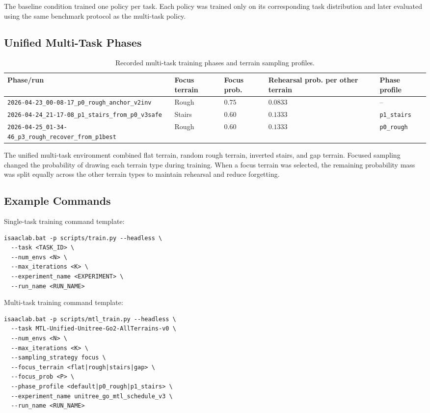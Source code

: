The baseline condition trained one policy per task. Each policy was trained only on its corresponding task distribution and later evaluated using the same benchmark protocol as the multi-task policy.

\subsection{Unified Multi-Task Phases}
\label{app:mtl-phases}

\begin{table}[htbp]
\centering
\caption{Recorded multi-task training phases and terrain sampling profiles.}
\label{tab:mtl-training-phases}
\begin{tabular}{lllll}
\toprule
Phase/run & Focus terrain & Focus prob. & Rehearsal prob. per other terrain & Phase profile \\
\midrule
\texttt{2026-04-23\_00-08-17\_p0\_rough\_anchor\_v2inv} & Rough & $0.75$ & $0.0833$ & -- \\
\texttt{2026-04-24\_21-17-08\_p1\_stairs\_from\_p0\_v3safe} & Stairs & $0.60$ & $0.1333$ & \texttt{p1\_stairs} \\
\texttt{2026-04-25\_01-34-46\_p3\_rough\_recover\_from\_p1best} & Rough & $0.60$ & $0.1333$ & \texttt{p0\_rough} \\
\bottomrule
\end{tabular}
\end{table}

The unified multi-task environment combined flat terrain, random rough terrain, inverted stairs, and gap terrain. Focused sampling changed the probability of drawing each terrain type during training. When a focus terrain was selected, the remaining probability mass was split equally across the other terrain types to maintain rehearsal and reduce forgetting.

\subsection{Example Commands}
\label{app:training-commands}

Single-task training command template:
\begin{verbatim}
isaaclab.bat -p scripts/train.py --headless \
  --task <TASK_ID> \
  --num_envs <N> \
  --max_iterations <K> \
  --experiment_name <EXPERIMENT> \
  --run_name <RUN_NAME>
\end{verbatim}

Multi-task training command template:
\begin{verbatim}
isaaclab.bat -p scripts/mtl_train.py --headless \
  --task MTL-Unified-Unitree-Go2-AllTerrains-v0 \
  --num_envs <N> \
  --max_iterations <K> \
  --sampling_strategy focus \
  --focus_terrain <flat|rough|stairs|gap> \
  --focus_prob <P> \
  --phase_profile <default|p0_rough|p1_stairs> \
  --experiment_name unitree_go_mtl_schedule_v3 \
  --run_name <RUN_NAME>
\end{verbatim}

